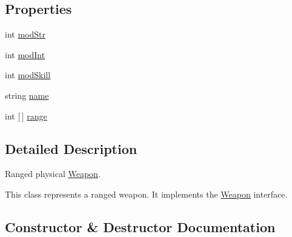 \subsection*{Properties}
\begin{DoxyCompactItemize}
\item 
int \hyperlink{class_model_1_1_weapon_module_1_1_long_bow_aefa38571f2e824c436833b8fed1b8e65}{mod\+Str}
\item 
int \hyperlink{class_model_1_1_weapon_module_1_1_long_bow_a0a9b8b342ba911bc9d39ea5c388a9241}{mod\+Int}
\item 
int \hyperlink{class_model_1_1_weapon_module_1_1_long_bow_a11e8c0740b84af41799a81faf98410b3}{mod\+Skill}
\item 
string \hyperlink{class_model_1_1_weapon_module_1_1_long_bow_a74c5ca976caf85a52e651746e53c9b62}{name}
\item 
int \mbox{[}$\,$\mbox{]} \hyperlink{class_model_1_1_weapon_module_1_1_long_bow_ad1c1cd55b24378a0496c669d66cfc459}{range}
\end{DoxyCompactItemize}


\subsection{Detailed Description}
Ranged physical \hyperlink{interface_model_1_1_weapon_module_1_1_weapon}{Weapon}. 

This class represents a ranged weapon. It implements the \hyperlink{interface_model_1_1_weapon_module_1_1_weapon}{Weapon} interface. 

\subsection{Constructor \& Destructor Documentation}
\hypertarget{class_model_1_1_weapon_module_1_1_long_bow_adbd4822fe9ff1519a2c226f0a1e8ee85}{}\label{class_model_1_1_weapon_module_1_1_long_bow_adbd4822fe9ff1519a2c226f0a1e8ee85} 
